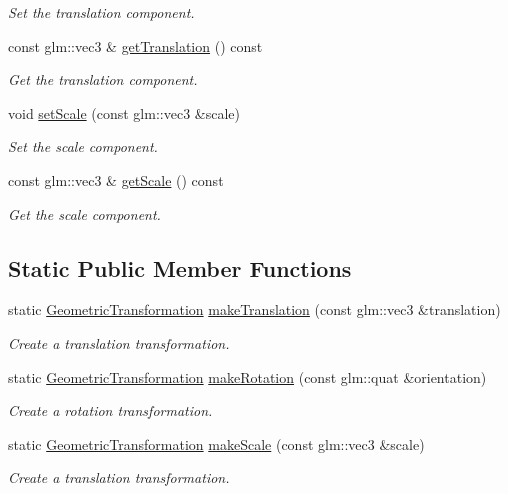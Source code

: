 \begin{DoxyCompactItemize}
\begin{DoxyCompactList}\small\item\em Set the translation component. \end{DoxyCompactList}\item 
const glm\+::vec3 \& \hyperlink{classGeometricTransformation_a4de17e179cb51a3b03e89b299f453b78}{get\+Translation} () const 
\begin{DoxyCompactList}\small\item\em Get the translation component. \end{DoxyCompactList}\item 
void \hyperlink{classGeometricTransformation_a9b3ac4cc16a1d0d52701dfc504bcea57}{set\+Scale} (const glm\+::vec3 \&scale)
\begin{DoxyCompactList}\small\item\em Set the scale component. \end{DoxyCompactList}\item 
const glm\+::vec3 \& \hyperlink{classGeometricTransformation_a9c6bdf05c928f78799d80548ca71db14}{get\+Scale} () const 
\begin{DoxyCompactList}\small\item\em Get the scale component. \end{DoxyCompactList}\end{DoxyCompactItemize}
\subsection*{Static Public Member Functions}
\begin{DoxyCompactItemize}
\item 
static \hyperlink{classGeometricTransformation}{Geometric\+Transformation} \hyperlink{classGeometricTransformation_a6eaf3dff22eb212019b1560c33939070}{make\+Translation} (const glm\+::vec3 \&translation)
\begin{DoxyCompactList}\small\item\em Create a translation transformation. \end{DoxyCompactList}\item 
static \hyperlink{classGeometricTransformation}{Geometric\+Transformation} \hyperlink{classGeometricTransformation_a7e93f08aeafdd0291f0a2e4e900678c8}{make\+Rotation} (const glm\+::quat \&orientation)
\begin{DoxyCompactList}\small\item\em Create a rotation transformation. \end{DoxyCompactList}\item 
static \hyperlink{classGeometricTransformation}{Geometric\+Transformation} \hyperlink{classGeometricTransformation_a66b7cde0093d04aae52ba65a264ef68f}{make\+Scale} (const glm\+::vec3 \&scale)
\begin{DoxyCompactList}\small\item\em Create a translation transformation. \end{DoxyCompactList}\end{DoxyCompactItemize}
